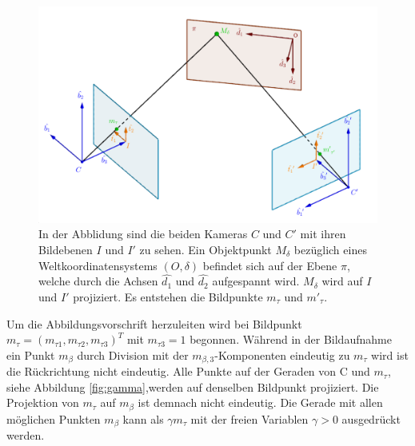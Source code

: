 \begin{figure}[!htb]
	\centering
	\includegraphics[width=0.8\linewidth]{images/HomographieDP_beschriftet.png}
	\caption[Abbildungsvorschrift in Homographien]{In der Abblidung sind die beiden Kameras $C$ und $C'$ mit ihren Bildebenen $I$ und $I'$ zu sehen. Ein Objektpunkt $M_\delta$ bezüglich eines Weltkoordinatensystems $(O,\delta)$ befindet sich auf der Ebene $\pi$, welche durch die Achsen $\hat{d_1}$ und $\hat{d_2}$ aufgespannt wird. $M_\delta$ wird auf $I$ und $I'$ projiziert. Es entstehen die Bildpunkte $m_\tau$ und $m'_\tau$.}  
	\label{fig:Homographie}
\end{figure}


Um die Abbildungsvorschrift herzuleiten wird bei  Bildpunkt \ensuremath{m_{\tau} = (m_{\tau1},m_{\tau2},m_{\tau3})^T} mit $m_{\tau3}=1$ begonnen. Während in der Bildaufnahme ein Punkt $m_\beta$ durch Division mit der $m_{\beta,3}$-Komponenten eindeutig zu $m_{\tau}$ wird ist die Rückrichtung nicht eindeutig. Alle Punkte auf der Geraden von C und $m_{\tau}$, siehe Abbildung \ref{fig:gamma},werden auf denselben Bildpunkt projiziert. Die Projektion von $m_{\tau}$ auf $m_\beta$ ist demnach nicht eindeutig. Die Gerade mit allen möglichen Punkten $m_\beta$ kann als $\gamma m_{\tau}$ mit der freien Variablen $\gamma > 0$ ausgedrückt werden.  



